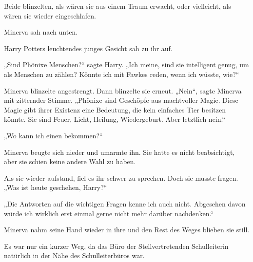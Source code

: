 Beide blinzelten, als wären sie aus einem Traum erwacht, oder vielleicht, als wären sie wieder eingeschlafen.

Minerva sah nach unten.

Harry Potters leuchtendes junges Gesicht sah zu ihr auf.

„Sind Phönixe Menschen?“ sagte Harry.
„Ich meine, sind sie intelligent genug, um als Menschen zu zählen? Könnte ich mit Fawkes reden, wenn ich wüsste, wie?“

Minerva blinzelte angestrengt. Dann blinzelte sie erneut.
„Nein“, sagte Minerva mit zitternder Stimme.
„Phönixe sind Geschöpfe aus machtvoller Magie. Diese Magie gibt ihrer Existenz eine Bedeutung, die kein einfaches Tier besitzen könnte. Sie sind Feuer, Licht, Heilung, Wiedergeburt. Aber letztlich nein.“

„Wo kann ich einen bekommen?“

Minerva beugte sich nieder und umarmte ihn. Sie hatte es nicht beabsichtigt, aber sie schien keine andere Wahl zu haben.

Als sie wieder aufstand, fiel es ihr schwer zu sprechen. Doch sie musste fragen.
„Was ist heute geschehen, Harry?“

„Die Antworten auf die wichtigen Fragen kenne ich auch nicht. Abgesehen davon würde ich wirklich erst einmal gerne nicht mehr darüber nachdenken.“

Minerva nahm seine Hand wieder in ihre und den Rest des Weges blieben sie still.

Es war nur ein kurzer Weg, da das Büro der Stellvertretenden Schulleiterin natürlich in der Nähe des Schulleiterbüros war.


